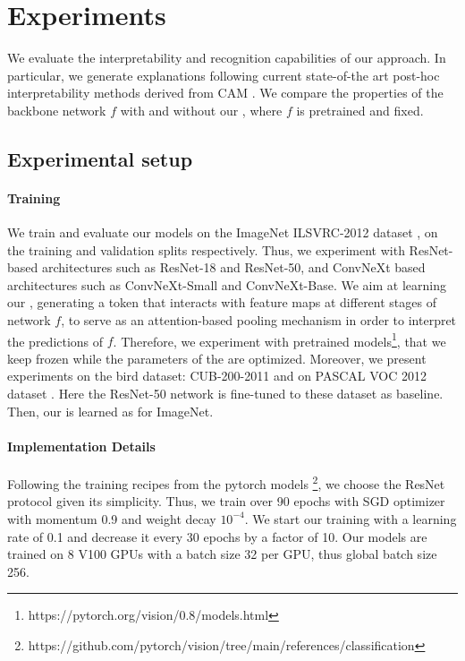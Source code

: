\section{Experiments}
\label{sec:castream_exp}
We evaluate the interpretability and recognition capabilities of our approach. In particular, we 
generate explanations following current state-of-the art post-hoc interpretability methods derived 
from CAM \autocite{zhou2016learning}. We compare the properties of the backbone network $f$ with 
and without our \Ours, where $f$ is pretrained and fixed.

\subsection{Experimental setup}
\label{subsec:castream_setup}
\paragraph{Training}
We train and evaluate our models on the ImageNet ILSVRC-2012 dataset \autocite{ILSVRC15}, 
on the training and validation splits respectively. Thus, we experiment with ResNet-based 
architectures \autocite{he2016deep} such as ResNet-18 and ResNet-50, and ConvNeXt based 
architectures \autocite{liu2022convnet} such as ConvNeXt-Small and ConvNeXt-Base. We aim at 
learning our \Ours, generating a \cls token that interacts with feature maps at different stages of 
network $f$, to serve as an attention-based pooling mechanism in order to interpret the predictions 
of $f$. Therefore, we experiment with pretrained models\footnote{https://pytorch.org/vision/0.8/models.html}, 
that we keep frozen while the parameters of the \Ours are optimized. 
Moreover, we present experiments on the bird dataset: CUB-200-2011 \cite{WahCUB_200_2011} and on 
PASCAL VOC 2012 dataset \cite{Everingham15}. Here the ResNet-50 network is fine-tuned to these 
dataset as baseline. Then, our \Ours is learned as for ImageNet.

\paragraph{Implementation Details}
Following the training recipes from the pytorch models 
\footnote{https://github.com/pytorch/vision/tree/main/references/classification}, we choose the 
ResNet protocol given its simplicity. Thus, we train over 90 epochs with SGD optimizer with 
momentum 0.9 and weight decay $10^{-4}$. We start our training with a learning rate of 0.1 and 
decrease it every 30 epochs by a factor of 10. Our models are trained on 8 V100 GPUs with a batch 
size 32 per GPU,  thus global batch size 256.\\

